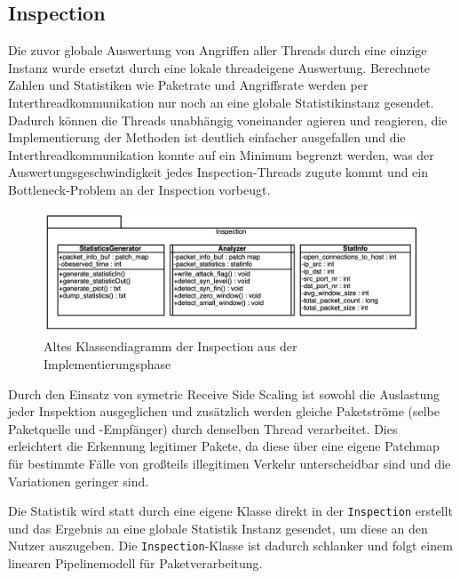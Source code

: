 \documentclass[../review_3.tex]{subfiles}
\begin{document}
\subsection{Inspection}
Die zuvor globale Auswertung von Angriffen aller Threads durch eine einzige Instanz wurde ersetzt durch eine lokale threadeigene Auswertung. Berechnete Zahlen und Statistiken wie Paketrate und Angriffsrate werden per Interthreadkommunikation nur noch an eine globale Statistikinstanz gesendet. Dadurch können die Threads unabhängig voneinander agieren und reagieren, die Implementierung der Methoden ist deutlich einfacher ausgefallen und die Interthreadkommunikation konnte auf ein Minimum begrenzt werden, was der Auswertungsgeschwindigkeit jedes Inspection-Threads zugute kommt und ein Bottleneck-Problem an der Inspection vorbeugt.

\begin{figure}[h]
    \centering
    \includegraphics[width=\linewidth]{img/Inspection_old.png}
    \caption{Altes Klassendiagramm der Inspection aus der Implementierungsphase}
    \label{InspectionOld}
\end{figure}

Durch den Einsatz von symetric Receive Side Scaling ist sowohl die Auslastung jeder Inspektion ausgeglichen und zusätzlich werden gleiche Paketströme (selbe Paketquelle und -Empfänger) durch denselben Thread verarbeitet. Dies erleichtert die Erkennung legitimer Pakete, da diese über eine eigene Patchmap für bestimmte Fälle von großteils illegitimen Verkehr unterscheidbar sind und die Variationen geringer sind.

Die Statistik wird statt durch eine eigene Klasse direkt in der \texttt{Inspection} erstellt und das Ergebnis an eine globale Statistik Instanz gesendet, um diese an den Nutzer auszugeben. Die \texttt{Inspection}-Klasse ist dadurch schlanker und folgt einem linearen Pipelinemodell für Paketverarbeitung.
\end{document}
